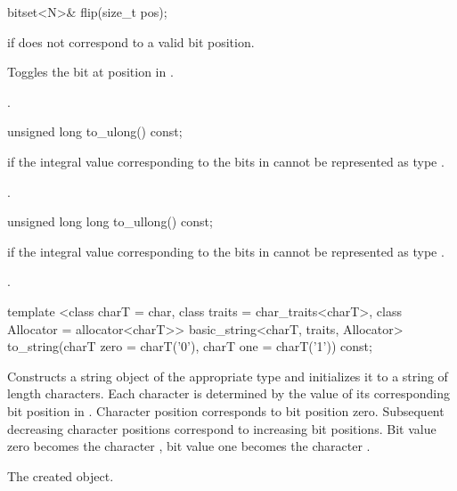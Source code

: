 %
\begin{itemdecl}
bitset<N>& flip(size_t pos);
\end{itemdecl}

\begin{itemdescr}
\pnum
\throws
{}
if  does not correspond to a valid bit position.%

\pnum
\effects
Toggles the bit at position  in
.

\pnum
\returns
{}.
\end{itemdescr}

%
\begin{itemdecl}
unsigned long to_ulong() const;
\end{itemdecl}

\begin{itemdescr}
\pnum
\throws
{}%
if the integral value  corresponding to the bits in
cannot be represented as type
.

\pnum
\returns
{}.
\end{itemdescr}

%
\begin{itemdecl}
unsigned long long to_ullong() const;
\end{itemdecl}

\begin{itemdescr}
\pnum
{}%
\throws
{}
if the integral value  corresponding to the bits in
cannot be represented as type
.

\pnum
\returns
{}.
\end{itemdescr}

%
\begin{itemdecl}
template <class charT = char,
    class traits = char_traits<charT>,
    class Allocator = allocator<charT>>
  basic_string<charT, traits, Allocator>
  to_string(charT zero = charT('0'), charT one = charT('1')) const;
\end{itemdecl}

\begin{itemdescr}
\pnum
\effects
Constructs a string object of the appropriate type
and initializes it to a string of length  characters.
Each character is determined by the value of its corresponding bit position in
.
Character position  corresponds to bit position zero.
Subsequent decreasing character positions correspond to increasing bit
positions.
Bit value zero becomes the character ,
bit value one becomes the character
.

\pnum
\returns
The created object.
\end{itemdescr}

